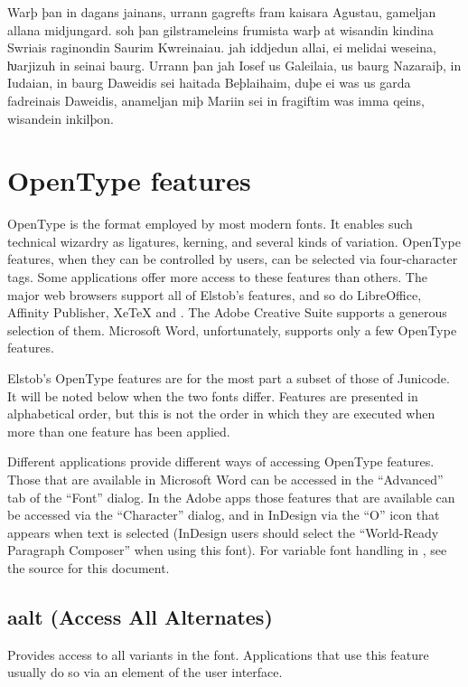 \documentclass[12pt,letterpaper,openany]{book}
\begin{document}
{\italslantedmedium\large Warþ þan in dagans jainans, urrann gagrefts fram kaisara Agustau, gameljan allana midjungard. soh þan gilstrameleins frumista warþ at wisandin kindina Swriais raginondin Saurim Kwreinaiau. jah iddjedun allai, ei melidai weseina, ƕarjizuh in seinai baurg. Urrann þan jah Iosef us Galeilaia, us baurg Nazaraiþ, in Iudaian, in baurg Daweidis sei haitada Beþlaihaim, duþe ei was us garda fadreinais Daweidis, anameljan miþ Mariin sei in fragiftim was imma qeins, wisandein inkilþon.}



\chapter{OpenType features}

OpenType is the format employed by most modern fonts. It enables such technical
wizardry as ligatures, kerning, and several kinds of variation. OpenType features,
when they can be controlled by users, can be selected via four-character tags.
Some applications offer more access to these features than others. The major web browsers
support all of Elstob’s features, and so do LibreOffice, Affinity Publisher,
XeTeX and {\ltech}. The Adobe Creative Suite supports a generous selection of
them. Microsoft Word, unfortunately, supports only a few OpenType features.

Elstob’s OpenType
features are for the most part a subset of those of Junicode. It will be noted
below when the two fonts differ. Features are presented in alphabetical order,
but this is not the order in which they are executed when more than one feature
has been applied.

Different applications provide different ways of accessing OpenType features.
Those that are available in Microsoft Word can be accessed in the “Advanced”
tab of the “Font” dialog. In the Adobe apps those features that are available
can be accessed via the “Character” dialog, and in InDesign via the “O” icon that
appears when text is selected (InDesign users should select the “World-Ready
Paragraph Composer” when using this font). For variable font handling in
{\ltech}, see the source for this document.

\section{aalt (Access All Alternates)}
Provides access to all variants in the font. Applications that use this feature
usually do so via an element of the user interface.
\end{document}
